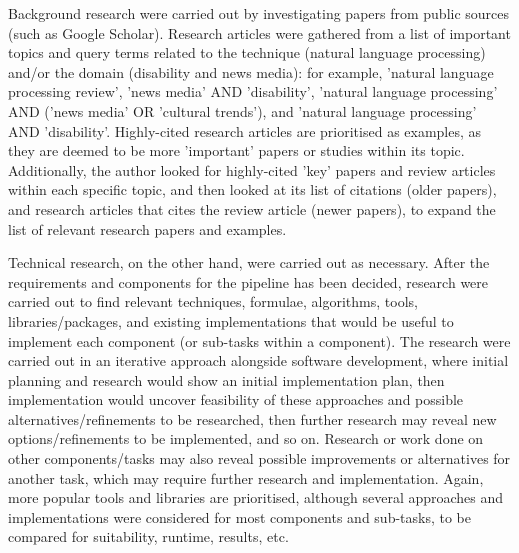 \documentclass{report}
\begin{document}
Background research were carried out by investigating papers from public sources (such as Google Scholar).
Research articles were gathered from a list of important topics and query terms related to the technique (natural language processing) and/or the domain (disability and news media): for example, 'natural language processing review', 'news media' AND 'disability', 'natural language processing' AND ('news media' OR 'cultural trends'), and 'natural language processing' AND 'disability'.
Highly-cited research articles are prioritised as examples, as they are deemed to be more 'important' papers or studies within its topic.
Additionally, the author looked for highly-cited 'key' papers and review articles within each specific topic, and then looked at its list of citations (older papers), and research articles that cites the review article (newer papers), to expand the list of relevant research papers and examples.

Technical research, on the other hand, were carried out as necessary.
After the requirements and components for the pipeline has been decided, research were carried out to find relevant techniques, formulae, algorithms, tools, libraries/packages, and existing implementations that would be useful to implement each component (or sub-tasks within a component).
The research were carried out in an iterative approach alongside software development, where initial planning and research would show an initial implementation plan, then implementation would uncover feasibility of these approaches and possible alternatives/refinements to be researched, then further research may reveal new options/refinements to be implemented, and so on.
Research or work done on other components/tasks may also reveal possible improvements or alternatives for another task, which may require further research and implementation.  
Again, more popular tools and libraries are prioritised, although several approaches and implementations were considered for most components and sub-tasks, to be compared for suitability, runtime, results, etc.
\end{document}
